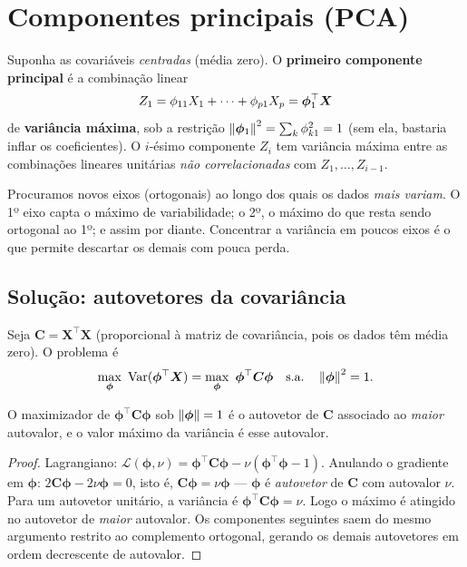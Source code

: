 \documentclass[11pt,a4paper]{article}
\begin{document}
\section{Componentes principais (PCA)}
Suponha as covariáveis \emph{centradas} (média zero). O \textbf{primeiro componente
principal} é a combinação linear
\[
  Z_1 = \phi_{11}X_1+\dots+\phi_{p1}X_p = \bm{\phi}_1^\top\bm{X}
\]
de \textbf{variância máxima}, sob a restrição $\left\lVert \bm{\phi}_1 \right\rVert^2=\sum_k\phi_{k1}^2=1$
(sem ela, bastaria inflar os coeficientes). O $i$-ésimo componente $Z_i$ tem variância
máxima entre as combinações lineares unitárias \emph{não correlacionadas} com
$Z_1,\dots,Z_{i-1}$.

\begin{ideia}
Procuramos novos eixos (ortogonais) ao longo dos quais os dados \emph{mais variam}.
O 1º eixo capta o máximo de variabilidade; o 2º, o máximo do que resta sendo
ortogonal ao 1º; e assim por diante. Concentrar a variância em poucos eixos é o que
permite descartar os demais com pouca perda.
\end{ideia}

\subsection{Solução: autovetores da covariância}
Seja $\bm{C}=\bm{X}^\top\bm{X}$ (proporcional à matriz de covariância, pois os dados
têm média zero). O problema é
\[
  \max_{\bm{\phi}}\ \Var(\bm{\phi}^\top\X) = \max_{\bm{\phi}}\ \bm{\phi}^\top\bm{C}\bm{\phi}
  \quad\text{s.a.}\quad \norm{\bm{\phi}}^2=1.
\]

\begin{proposicao}\label{prop:pca}
O maximizador de $\bm{\phi}^\top\bm{C}\bm{\phi}$ sob $\left\lVert \bm{\phi} \right\rVert=1$ é o
autovetor de $\bm{C}$ associado ao \emph{maior} autovalor, e o valor máximo da
variância é esse autovalor.
\end{proposicao}
\begin{proof}
Lagrangiano: $\mathcal{L}(\bm{\phi},\nu)=\bm{\phi}^\top\bm{C}\bm{\phi}
-\nu(\bm{\phi}^\top\bm{\phi}-1)$. Anulando o gradiente em $\bm{\phi}$:
$2\bm{C}\bm{\phi}-2\nu\bm{\phi}=0$, isto é, $\bm{C}\bm{\phi}=\nu\bm{\phi}$ ---
$\bm{\phi}$ é \emph{autovetor} de $\bm{C}$ com autovalor $\nu$. Para um autovetor
unitário, a variância é $\bm{\phi}^\top\bm{C}\bm{\phi}=\nu$. Logo o máximo é atingido
no autovetor de \emph{maior} autovalor. Os componentes seguintes saem do mesmo
argumento restrito ao complemento ortogonal, gerando os demais autovetores em ordem
decrescente de autovalor.
\end{proof}
\end{document}
